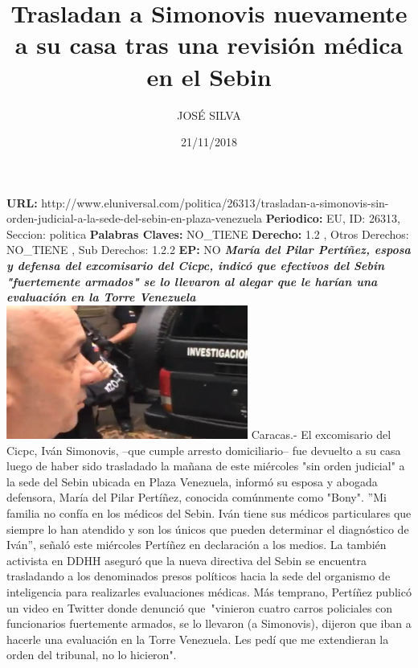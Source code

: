 \documentclass{article}%
\title{\textbf{Trasladan a Simonovis nuevamente a su casa tras una revisión médica en el Sebin}}%
\author{JOSÉ SILVA}%
\date{21/11/2018}%
\begin{document}
%
\normalsize%
\maketitle%
\textbf{URL: }%
http://www.eluniversal.com/politica/26313/trasladan{-}a{-}simonovis{-}sin{-}orden{-}judicial{-}a{-}la{-}sede{-}del{-}sebin{-}en{-}plaza{-}venezuela\newline%
%
\textbf{Periodico: }%
EU, %
ID: %
26313, %
Seccion: %
politica\newline%
%
\textbf{Palabras Claves: }%
NO\_TIENE\newline%
%
\textbf{Derecho: }%
1.2%
, Otros Derechos: %
NO\_TIENE%
, Sub Derechos: %
1.2.2%
\newline%
%
\textbf{EP: }%
NO\newline%
\newline%
%
\textbf{\textit{María del Pilar Pertíñez, esposa y defensa del excomisario del Cicpc, indicó que efectivos del Sebin "fuertemente armados" se lo llevaron al alegar que le harían una evaluación en la Torre Venezuela}}%
\newline%
\newline%
%
\includegraphics[width=300px]{128.jpg}%
\newline%
%
Caracas.{-} El excomisario del Cicpc, Iván Simonovis, –que cumple arresto domiciliario– fue devuelto a su casa luego de haber sido trasladado la mañana de este miércoles "sin orden judicial" a la sede del Sebin ubicada en Plaza Venezuela, informó su esposa y abogada defensora, María del Pilar Pertíñez, conocida comúnmente como "Bony".%
\newline%
%
”Mi familia no confía en los médicos del Sebin. Iván tiene sus médicos particulares que siempre lo han atendido y son los únicos que pueden determinar el diagnóstico de Iván”, señaló este miércoles Pertíñez en declaración a los medios.%
\newline%
%
La también activista en DDHH aseguró que la nueva directiva del Sebin se encuentra trasladando a los denominados presos políticos hacia la sede del organismo de inteligencia para realizarles evaluaciones médicas.%
\newline%
%
Más temprano, Pertíñez publicó un video en Twitter donde denunció que~"vinieron cuatro carros policiales con funcionarios fuertemente armados, se lo llevaron (a Simonovis), dijeron que iban a hacerle una evaluación en la Torre Venezuela.  Les pedí que me extendieran la orden del tribunal, no lo hicieron".%
\newline%
%
\end{document}
